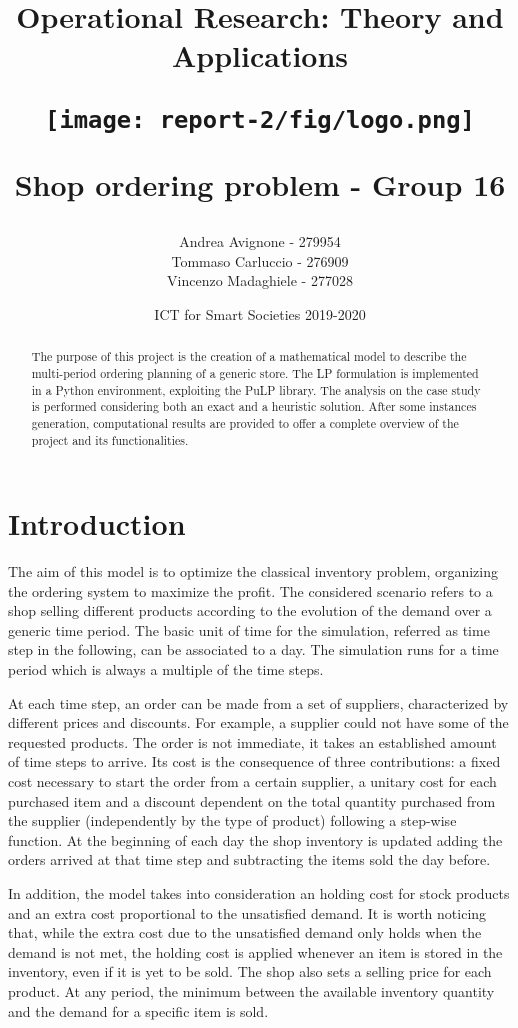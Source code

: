 \documentclass{article}
\title{
{Operational Research: Theory and Applications}\par
\vspace{12pt}
\texttt{[image: report-2/fig/logo.png]}\par
{ Shop ordering problem - Group 16} \par
}
\date{ ICT for Smart Societies 2019-2020}
\author{Andrea Avignone - 279954\\
		Tommaso Carluccio - 276909\\
		Vincenzo Madaghiele - 277028\\}
\begin{document}
\maketitle
\begin{abstract}
\noindent
The purpose of this project is the creation of a mathematical model to describe the multi-period ordering planning of a generic store. The LP formulation is implemented in a Python environment, exploiting the PuLP library. The analysis on the case study is performed considering both an exact and a heuristic solution. After some instances generation, computational results are provided to offer a complete overview of the project and its functionalities.
\end{abstract}
\section{Introduction}
The aim of this model is to optimize the classical inventory problem, organizing the ordering system to maximize the profit. The considered scenario refers to a shop selling different products according to the evolution of the demand over a generic time period. 
The basic unit of time for the simulation, referred as time step in the following, can be associated to a day. The simulation runs for a time period which is always a multiple of the time steps. \par
At each time step, an order can be made from a set of suppliers, characterized by different prices and discounts. For example, a supplier could not have some of the requested products. The order is not immediate, it takes an established amount of time steps to arrive. Its cost is the consequence of three contributions: a fixed cost necessary to start the order from a certain supplier, a unitary cost for each purchased item and a discount dependent on the total quantity purchased from the supplier (independently by the type of product) following a step-wise function. At the beginning of each day the shop inventory is updated adding the orders arrived at that time step and subtracting the items sold the day before. \par 
In addition, the model takes into consideration an holding cost for stock products and an extra cost proportional to the unsatisfied demand. It is worth noticing that, while the extra cost due to the unsatisfied demand only holds when the demand is not met, the holding cost is applied whenever an item is stored in the inventory, even if it is yet to be sold. The shop also sets a selling price for each product. At any period, the minimum between the available inventory quantity and the demand for a specific item is sold.
\end{document}
